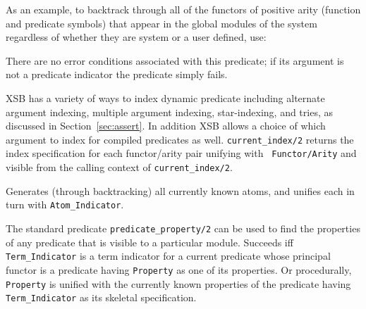 \begin{description}
As an example, to backtrack through all of the functors of positive
arity (function and predicate symbols) that appear in the global
modules of the system regardless of whether they are system or a user
defined, use:


    There are no error conditions associated with this predicate; if its 
    argument is not a predicate indicator the predicate simply fails.

%
XSB has a variety of ways to index dynamic predicate including
alternate argument indexing, multiple argument indexing,
star-indexing, and tries, as discussed in Section~\ref{sec:assert}.
In addition XSB allows a choice of which argument to index for
compiled predicates as well.  {\tt current\_index/2} returns the index
specification for each functor/arity pair unifying with {\tt
Functor/Arity} and visible from the calling context of  {\tt current\_index/2}.

    Generates (through backtracking) all currently known atoms, and unifies
    each in turn with {\tt Atom\_Indicator}. 

\label{PredProp}
    The standard predicate {\tt predicate\_property/2} can be used to find 
    the properties of any predicate that is visible to a particular module.
    Succeeds iff {\tt Term\_Indicator} is a term indicator for a current 
    predicate whose principal functor is a predicate having {\tt Property} 
    as one of its properties. Or procedurally, {\tt Property} is unified 
    with the currently known properties of the predicate having 
    {\tt Term\_Indicator} as its skeletal specification.
    

\end{description}
